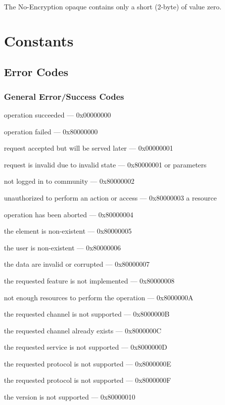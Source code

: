 \documentclass[titlepage,oneside]{book}
\begin{document}
\par{} The No-Encryption opaque contains only a short (2-byte) of
value zero.

\section{Constants}
\subsection{Error Codes}
\subsubsection{General Error/Success Codes}

operation succeeded                               --- 0x00000000

operation failed                                  --- 0x80000000

request accepted but will be served later         --- 0x00000001

request is invalid due to invalid state           --- 0x80000001
or parameters

not logged in to community                        --- 0x80000002

unauthorized to perform an action or access       --- 0x80000003
a resource

operation has been aborted                        --- 0x80000004

the element is non-existent                       --- 0x80000005

the user is non-existent                          --- 0x80000006

the data are invalid or corrupted                 --- 0x80000007

the requested feature is not implemented          --- 0x80000008

not enough resources to perform the operation     --- 0x8000000A

the requested channel is not supported            --- 0x8000000B

the requested channel already exists              --- 0x8000000C

the requested service is not supported            --- 0x8000000D

the requested protocol is not supported           --- 0x8000000E

the requested protocol is not supported           --- 0x8000000F

the version is not supported                      --- 0x80000010
\end{document}
